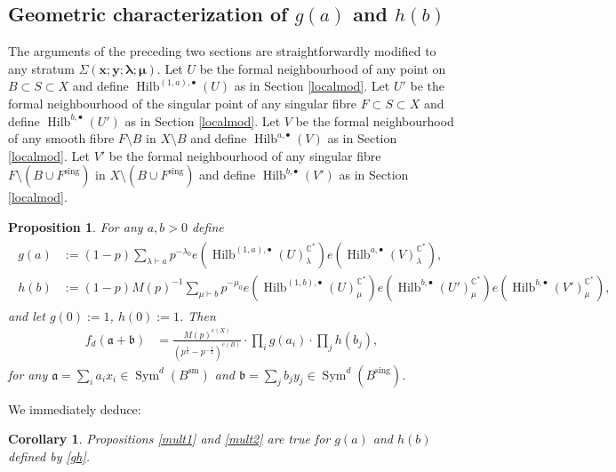 \documentclass{amsart}
\newtheorem{proposition}[theorem]{Proposition}
\newtheorem{corollary}[theorem]{Corollary}
\theoremstyle{definition}
\newcommand{\CC} {\mathbb{C}}          %
\newcommand{\Sym}{\operatorname{Sym}}
\newcommand{\Hilb}{\operatorname{Hilb}}
\newcommand{\sm}{\operatorname{sm}}
\newcommand{\sing}{\operatorname{sing}}
\begin{document}
   
\subsection{Geometric characterization of $g(a)$ and $h(b)$} \label{chargh}

The arguments of the preceding two sections are straightforwardly modified to any stratum $\Sigma(\boldsymbol{x};\boldsymbol{y};\boldsymbol{\lambda};\boldsymbol{\mu})$. Let $U$ be the formal neighbourhood of any point on $B \subset S \subset X$ and define $\Hilb^{(1,a),\bullet}(U)$ as in Section \ref{localmod}. Let $U'$ be the formal neighbourhood of the singular point of any singular fibre $F \subset S \subset X$ and define $\Hilb^{b,\bullet}(U')$ as in Section \ref{localmod}. Let $V$ be the formal neighbourhood of any smooth fibre $F \setminus B$ in $X \setminus B$ and define $\Hilb^{a,\bullet}(V)$ as in Section \ref{localmod}. Let $V'$ be the formal neighbourhood of any singular fibre $F \setminus (B \cup F^{\sing})$ in $X \setminus (B \cup F^{\sing})$ and define $\Hilb^{b,\bullet}(V')$ as in Section \ref{localmod}. 

\begin{proposition}
For any $a,b>0$ define
\begin{align}
\begin{split} \label{gh}
g(a) &:= (1-p) \sum_{\lambda \vdash a} p^{-\lambda_0} e(\Hilb^{(1,a),\bullet}(U)_{\lambda}^{\CC^*}) e(\Hilb^{a,\bullet}(V)_{\lambda}^{\CC^*}), \\
h(b) &:= (1-p) M(p)^{-1} \sum_{\mu \vdash b} p^{-\mu_0} e(\Hilb^{(1,b),\bullet}(U)_{\mu}^{\CC^*}) e(\Hilb^{b,\bullet}(U')_{\mu}^{\CC^*}) e(\Hilb^{b,\bullet}(V')_{\mu}^{\CC^*}),
\end{split}
\end{align}
and let $g(0) := 1$, $h(0) :=1$. Then
\begin{align*}
f_{d}(\mathfrak{a} + \mathfrak{b}) &= \frac{M(p)^{e(X)}}{(p^{\frac{1}{2}}-p^{-\frac{1}{2}})^{e(B)}} \cdot \prod_{i} g(a_i) \cdot \prod_{j} h(b_j), 
\end{align*}
for any $\mathfrak{a} = \sum_i a_i x_i \in \Sym^{d}(B^{\sm})$ and $\mathfrak{b} = \sum_j b_j y_j \in \Sym^{d}(B^{\sing})$.
\end{proposition}
   
We immediately deduce:  
\begin{corollary} 
Propositions \ref{mult1} and \ref{mult2} are true for $g(a)$ and $h(b)$ defined by \eqref{gh}.
\end{corollary}   
   
\end{document}
